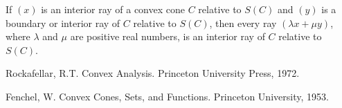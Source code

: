 \documentclass[11pt,a4paper]{article}
\begin{document}
\begin{lemma}
    If $(x)$ is an interior ray of a convex cone $C$ relative to $S(C)$ and $(y)$ is a boundary or interior ray of $C$ relative to $S(C)$, then every ray $(\lambda x+\mu y)$, where $\lambda$ and $\mu$ are positive real numbers, is an interior ray of $C$ relative to $S(C)$. 
\end{lemma}






\begin{thebibliography}{9}
    Rockafellar, R.T. Convex Analysis. Princeton University Press, 1972.
    
    Fenchel, W. Convex Cones, Sets, and Functions. Princeton University, 1953.
    
    
\end{thebibliography}
    
\end{document}
